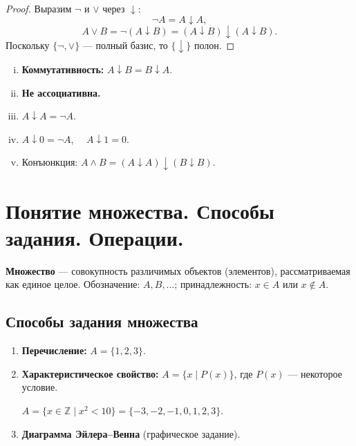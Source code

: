 \documentclass[12pt]{article}
\begin{document}
\begin{proof}
Выразим $\neg$ и $\vee$ через $\downarrow$:
\[
\neg A = A \downarrow A,
\]
\[
A \vee B = \neg(A \downarrow B) = (A \downarrow B) \downarrow (A \downarrow B).
\]
Поскольку $\{\neg, \vee\}$ --- полный базис, то $\{\downarrow\}$ полон.
\end{proof}

\begin{property}
\begin{enumerate}[(i)]
\item \textbf{Коммутативность:} $A \downarrow B = B \downarrow A$.
\item \textbf{Не ассоциативна.}
\item $A \downarrow A = \neg A$.
\item $A \downarrow 0 = \neg A$, $\quad A \downarrow 1 = 0$.
\item Конъюнкция:
      $A \wedge B = (A \downarrow A) \downarrow (B \downarrow B)$.
\end{enumerate}
\end{property}

\section{Понятие множества. Способы задания. Операции.}

\begin{definition}
\textbf{Множество} --- совокупность различимых объектов (элементов),
рассматриваемая как единое целое. Обозначение: $A, B, \ldots$;
принадлежность: $x \in A$ или $x \notin A$.
\end{definition}

\subsection{Способы задания множества}

\begin{enumerate}
\item \textbf{Перечисление:} $A = \{1, 2, 3\}$.
\item \textbf{Характеристическое свойство:} $A = \{x \mid P(x)\}$,
      где $P(x)$ --- некоторое условие.
      \begin{example} $A = \{x \in \mathbb{Z} \mid x^2 < 10\}
      = \{-3,-2,-1,0,1,2,3\}$. \end{example}
\item \textbf{Диаграмма Эйлера--Венна} (графическое задание).
\end{enumerate}
\end{document}
